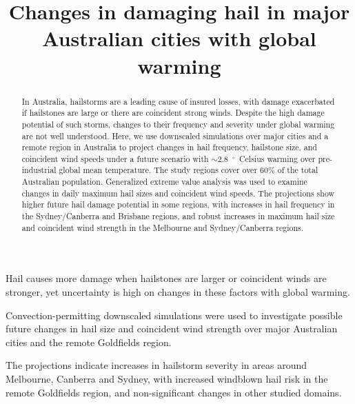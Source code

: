 \documentclass[]{agujournal2019}\usepackage[]{graphicx}\usepackage[]{xcolor}
\begin{document}
\title{Changes in damaging hail in major Australian cities with global warming}




\begin{keypoints}
\item Hail causes more damage when hailstones are larger or coincident winds are stronger, yet uncertainty is high on changes in these factors with global warming.
\item Convection-permitting downscaled simulations were used to investigate possible future changes in hail size and coincident wind strength over major Australian cities and the remote Goldfields region.
\item The projections indicate increases in hailstorm severity in areas around Melbourne, Canberra and Sydney, with increased windblown hail risk in the remote Goldfields region, and non-significant changes in other studied domains.
\end{keypoints}

\begin{abstract} %
      In Australia, hailstorms are a leading cause of insured losses, with damage exacerbated if hailstones are large or there are coincident strong winds. Despite the high damage potential of such storms, changes to their frequency and severity under global warming are not well understood. Here, we use downscaled simulations over major cities and a remote region in Australia to project changes in hail frequency, hailstone size, and coincident wind speeds under a future scenario with $\sim$2.8~$^{\circ{}}$~Celsius warming over pre-industrial global mean temperature. The study regions cover over 60\% of the total Australian population. Generalized extreme value analysis was used to examine changes in daily maximum hail sizes and coincident wind speeds. The projections show higher future hail damage potential in some regions, with increases in hail frequency in the Sydney/Canberra and Brisbane regions, and robust increases in maximum hail size and coincident wind strength in the Melbourne and Sydney/Canberra regions.
\end{abstract}
\end{document}
